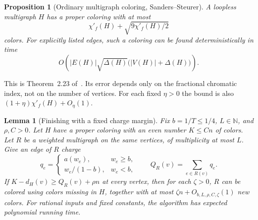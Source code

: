 \documentclass[11pt]{article}
\newtheorem{lemma}[theorem]{Lemma}
\newtheorem{proposition}[theorem]{Proposition}
\theoremstyle{definition}\newtheorem{algorithm}{Algorithm}[section]
\numberwithin{equation}{section}
\theoremstyle{remark}\newtheorem*{remark}{Remark}
\begin{document}
\begin{proposition}[Ordinary multigraph coloring, Sanders--Steurer]
\label{prop:general-ordinary-coloring}
A loopless multigraph $H$ has a proper coloring with at most
\[
 \chi'_f(H)+\sqrt{9\chi'_f(H)/2}
\]
colors. For explicitly listed edges, such a coloring can be found
deterministically in time
\[
 O\!\left(|E(H)|\sqrt{\Delta(H)}\bigl(|V(H)|+\Delta(H)\bigr)\right).
\]
\end{proposition}
This is Theorem~2.23 of~\cite{SS}. Its error depends only on the
fractional chromatic index, not on the number of vertices. For each
fixed $\eta>0$ the bound is also
$(1+\eta)\chi'_f(H)+O_\eta(1)$.

\begin{lemma}[Finishing with a fixed charge margin]
\label{lem:general-charge-finish}
Fix $b=1/T\le1/4$, $L\in\mathbb N$, and $\rho,C>0$.
Let $H$ have a proper coloring with an even number $K\le Cn$ of
colors. Let $R$ be a weighted multigraph on the same vertices, of
multiplicity at most $L$. Give an edge of $R$ charge
\[
 q_e=\begin{cases}
       a(w_e),&w_e\ge b,\\
       w_e/(1-b),&w_e<b,
     \end{cases}
 \qquad Q_R(v)=\sum_{e\in R(v)}q_e.
\]
If $K-d_H(v)\ge Q_R(v)+\rho n$ at every vertex, then for each
$\zeta>0$, $R$ can be colored using colors missing in $H$, together
with at most $\zeta n+O_{b,L,\rho,C,\zeta}(1)$ new colors.
For rational inputs and fixed constants, the algorithm has expected
polynomial running time.
\end{lemma}
\end{document}
